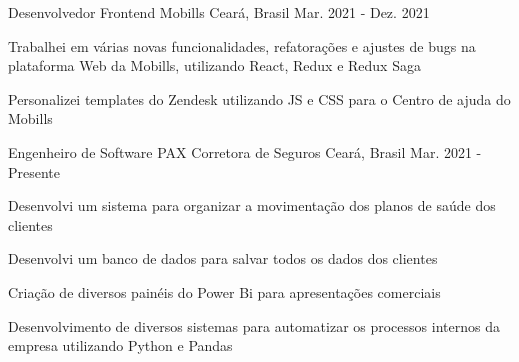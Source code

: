 

\begin{cventries}

\cventry
{Desenvolvedor Frontend} %
{Mobills} %
{Ceará, Brasil} %
{Mar. 2021 - Dez. 2021} %
{
  \begin{cvitems} %
    \item {Trabalhei em várias novas
    funcionalidades, refatorações e
    ajustes de bugs na plataforma Web
    da Mobills, utilizando React,
    Redux e Redux Saga}
    \item {Personalizei templates do Zendesk
    utilizando JS e CSS para o Centro
    de ajuda do Mobills}
  \end{cvitems}
}

  \cventry
    {Engenheiro de Software} %
    {PAX Corretora de
    Seguros} %
    {Ceará, Brasil} %
    {Mar. 2021 - Presente} %
    {
      \begin{cvitems} %
        \item {Desenvolvi um sistema para organizar a movimentação dos planos de saúde dos clientes}
        \item {Desenvolvi um banco de dados
        para salvar todos os dados dos clientes}
        \item {Criação de diversos painéis do Power Bi para apresentações comerciais}
        \item {Desenvolvimento de diversos
        sistemas para automatizar os processos internos da empresa utilizando Python e Pandas}
      \end{cvitems}
    }

\end{cventries}
